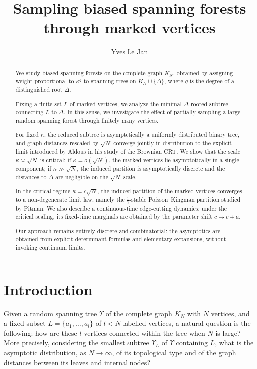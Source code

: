 \documentclass[11pt]{article}
\author{Yves Le Jan}
\title{Sampling biased spanning forests through marked vertices}
\begin{document}
\maketitle
\begin{abstract}
We study biased spanning forests on the complete graph \(K_N\), obtained by
assigning weight proportional to \(\kappa^q\) to spanning trees on
\(K_N\cup\{\Delta\}\), where \(q\) is the degree of a distinguished root
\(\Delta\).

Fixing a finite set \(L\) of marked vertices, we analyze the minimal
\(\Delta\)-rooted subtree connecting \(L\) to \(\Delta\). In this sense, we
investigate the effect of partially sampling a large random spanning forest
through finitely many vertices.

For fixed \(\kappa\), the reduced subtree is asymptotically a uniformly
distributed binary tree, and graph distances rescaled by \(\sqrt N\) converge
jointly in distribution to the explicit limit introduced by Aldous in his
study of the Brownian CRT. We show that the scale
\(\kappa\asymp\sqrt N\) is critical: if \(\kappa=o(\sqrt N)\), the marked
vertices lie asymptotically in a single component; if
\(\kappa\gg\sqrt N\), the induced partition is asymptotically discrete and
the distances to \(\Delta\) are negligible on the \(\sqrt N\) scale.

In the critical regime \(\kappa=c\sqrt N\), the induced partition of the
marked vertices converges to a non-degenerate limit law, namely the
\(\tfrac12\)-stable Poisson--Kingman partition studied by Pitman. We also
describe a continuous-time edge-cutting dynamics: under the critical scaling,
its fixed-time marginals are obtained by the parameter shift
\(c\mapsto c+a\).

Our approach remains entirely discrete and combinatorial: the asymptotics are
obtained from explicit determinant formulas and elementary expansions, without
invoking continuum limits.

\end{abstract}
\section{Introduction}

Given a random spanning tree $\Upsilon$ of the complete graph
$K_N$ with $N$ vertices, and a fixed subset
$L=\{a_1,\dots,a_l\}$ of $l<N$ labelled vertices,
a natural question is the following:
how are these $l$ vertices connected within the tree when $N$ is large?
More precisely, considering the smallest subtree
$\Upsilon_L$ of $\Upsilon$ containing $L$,
what is the asymptotic distribution, as $N\to\infty$,
of its topological type and of the graph distances
between its leaves and internal nodes?
\end{document}
